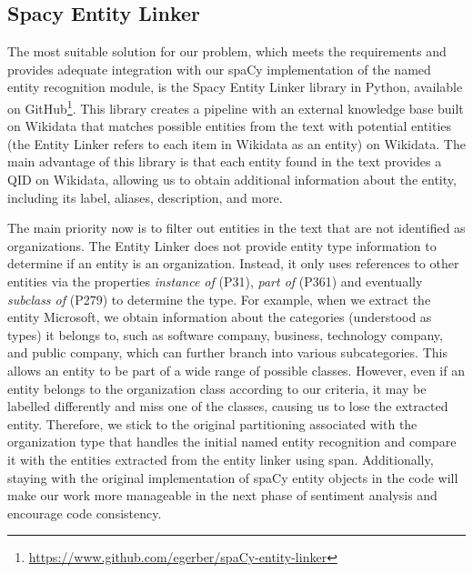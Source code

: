 \subsection{Spacy Entity Linker}
\label{subsec:spacy-entity-linker}
The most suitable solution for our problem, which meets the requirements and provides adequate integration with our spaCy implementation of the named entity recognition module, is the Spacy Entity Linker library in Python, available on GitHub\footnote{\href{https://www.github.com/egerber/spaCy-entity-linker}{https://www.github.com/egerber/spaCy-entity-linker}}. This library creates a pipeline with an external knowledge base built on Wikidata that matches possible entities from the text with potential entities (the Entity Linker refers to each item in Wikidata as an entity) on Wikidata. The main advantage of this library is that each entity found in the text provides a QID on Wikidata, allowing us to obtain additional information about the entity, including its label, aliases, description, and more.

The main priority now is to filter out entities in the text that are not identified as organizations. The Entity Linker does not provide entity type information to determine if an entity is an organization. Instead, it only uses references to other entities via the properties \textit{instance of} (P31), \textit{part of} (P361) and eventually \textit{subclass of} (P279) to determine the type. For example, when we extract the entity Microsoft, we obtain information about the categories (understood as types) it belongs to, such as software company, business, technology company, and public company, which can further branch into various subcategories. This allows an entity to be part of a wide range of possible classes. However, even if an entity belongs to the organization class according to our criteria, it may be labelled differently and miss one of the classes, causing us to lose the extracted entity. Therefore, we stick to the original partitioning associated with the organization type that handles the initial named entity recognition and compare it with the entities extracted from the entity linker using span. Additionally, staying with the original implementation of spaCy entity objects in the code will make our work more manageable in the next phase of sentiment analysis and encourage code consistency.

